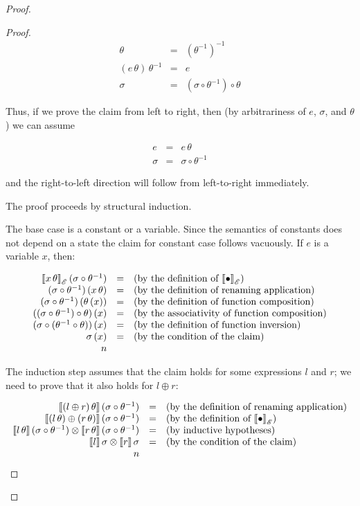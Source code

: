 \begin{proof}
\begin{proof}
    \[
    \begin{array}{rcl}
      \theta&=&(\theta^{-1})^{-1}\\
      (e\,\theta)\,\theta^{-1}&=&e\\
      \sigma&=&(\sigma\circ\theta^{-1})\circ\theta
    \end{array}
    \]

    Thus, if we prove the claim from left to right, then (by arbitrariness of $e$, $\sigma$, and $\theta$) we can
    assume

    \[
    \begin{array}{rcl}
      e&=&e\,\theta\\
      \sigma&=&\sigma\circ\theta^{-1}
    \end{array}
    \]

    and the right-to-left direction will follow from left-to-right immediately.
    
    The proof proceeds by structural induction.

    The base case is a constant or a variable. Since the semantics of constants does not depend on a state the
    claim for constant case follows vacuously. If $e$ is a variable $x$, then:

    \[
    \begin{array}{rcl}
      \sembr{x\,\theta}^\ph_\mathscr{E}\,(\sigma\circ\theta^{-1})&=&\mbox{(by the definition of $\sembr{\bullet}^\ph_\mathscr{E}$)}\\
      (\sigma\circ\theta^{-1})\,(x\,\theta)&=&\mbox{(by the definition of renaming application)}\\
      (\sigma\circ\theta^{-1})\,(\theta\,(x))&=&\mbox{(by the definition of function composition)}\\
      ((\sigma\circ\theta^{-1})\circ\theta)\,(x)&=&\mbox{(by the associativity of function composition)}\\
      (\sigma\circ(\theta^{-1}\circ\theta))\,(x)&=&\mbox{(by the definition of function inversion)}\\
      \sigma\,(x)&=&\mbox{(by the condition of the claim)}\\
      n&&
    \end{array}
    \]

    The induction step assumes that the claim holds for some expressions $l$ and $r$; we need to prove that it also holds for
    $l\oplus r$:

    \[
    \begin{array}{rcl}
      \sembr{(l\oplus r)\,\theta}\,(\sigma\circ\theta^{-1})&=&\mbox{(by the definition of renaming application)}\\
      \sembr{(l\,\theta)\oplus(r\,\theta)}\,(\sigma\circ\theta^{-1})&=&\mbox{(by the definition of $\sembr{\bullet}^\ph_\mathscr{E}$)}\\
      \sembr{l\,\theta}\,(\sigma\circ\theta^{-1})\otimes\sembr{r\,\theta}\,(\sigma\circ\theta^{-1})&=&\mbox{(by inductive hypotheses)}\\
      \sembr{l}\,\sigma\otimes\sembr{r}\,\sigma&=&\mbox{(by the condition of the claim)}\\
      n&&      
    \end{array}
    \]


\end{proof}
\end{proof}
